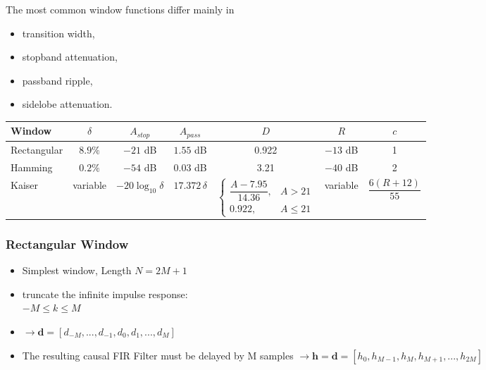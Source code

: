 The most common window functions differ mainly in

\begin{itemize}
\item transition width,
\item stopband attenuation,
\item passband ripple,
\item sidelobe attenuation.
\end{itemize}

\begin{center}
\renewcommand{\arraystretch}{1.25}
\begin{tabular}{|l|c|c|c|c|c|c|}
\hline
Window &
$\delta$ &
$A_{stop}$ &
$A_{pass}$ &
$D$ &
$R$ &
$c$
\\
\hline

Rectangular
&
$8.9\%$
&
$-21$ dB
&
$1.55$ dB
&
0.922
&
$-13$ dB
&
1
\\
\hline

Hamming
&
$0.2\%$
&
$-54$ dB
&
$0.03$ dB
&
3.21
&
$-40$ dB
&
2
\\
\hline

Kaiser
&
variable
&
$-20\log_{10}\delta$
&
$17.372\,\delta$
&
$
\begin{cases}
\dfrac{A-7.95}{14.36},
&A>21
\\[1ex]
0.922,
&A\le21
\end{cases}
$
&
variable
&
$\dfrac{6(R+12)}{55}$
\\
\hline

\end{tabular}
\end{center}

\subsubsection{Rectangular Window}
\begin{multicols}{2}
	\begin{itemize}
		\item Simplest window, Length $N = 2M+1$
		\item truncate the infinite impulse response: \\ $-M \leq k \leq M$
		\item $\rightarrow \mathbf{d} = [d_{-M}, ..., d_{-1}, d_0, d_1, ..., d_M]$
		\item The resulting causal FIR Filter must be delayed by M samples \newline
		$\rightarrow \mathbf{h} = \mathbf{d} = [h_0, h_{M-1}, h_M, h_{M+1}, ..., h_{2M}]$
	\end{itemize}

	\begin{center}
		
	\end{center}
\end{multicols}


